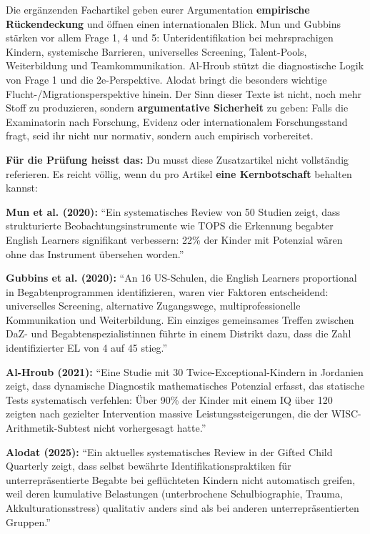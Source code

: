 \documentclass[ngerman, a4paper]{article}
\begin{document}
\begin{kapitelueberblick}
Die ergänzenden Fachartikel geben eurer Argumentation \textbf{empirische Rückendeckung} und öffnen einen internationalen Blick. Mun und Gubbins stärken vor allem Frage 1, 4 und 5: Unteridentifikation bei mehrsprachigen Kindern, systemische Barrieren, universelles Screening, Talent-Pools, Weiterbildung und Teamkommunikation. Al-Hroub stützt die diagnostische Logik von Frage 1 und die 2e-Perspektive. Alodat bringt die besonders wichtige Flucht-/Migrationsperspektive hinein. Der Sinn dieser Texte ist nicht, noch mehr Stoff zu produzieren, sondern \textbf{argumentative Sicherheit} zu geben: Falls die Examinatorin nach Forschung, Evidenz oder internationalem Forschungsstand fragt, seid ihr nicht nur normativ, sondern auch empirisch vorbereitet.

\medskip\textbf{Für die Prüfung heisst das:} Du musst diese Zusatzartikel nicht vollständig referieren. Es reicht völlig, wenn du pro Artikel \textbf{eine Kernbotschaft} behalten kannst:

\medskip\textbf{Mun et al. (2020):} \enquote{Ein systematisches Review von 50 Studien zeigt, dass
strukturierte Beobachtungsinstrumente wie TOPS die Erkennung begabter English Learners
signifikant verbessern: 22\% der Kinder mit Potenzial wären ohne das Instrument übersehen
worden.}

\medskip\textbf{Gubbins et al. (2020):} \enquote{An 16 US-Schulen, die English Learners proportional
in Begabtenprogrammen identifizieren, waren vier Faktoren entscheidend: universelles
Screening, alternative Zugangswege, multiprofessionelle Kommunikation und Weiterbildung.
Ein einziges gemeinsames Treffen zwischen DaZ- und Begabtenspezialistinnen führte in
einem Distrikt dazu, dass die Zahl identifizierter EL von 4 auf 45 stieg.}

\medskip\textbf{Al-Hroub (2021):} \enquote{Eine Studie mit 30 Twice-Exceptional-Kindern in Jordanien
zeigt, dass dynamische Diagnostik mathematisches Potenzial erfasst, das statische Tests
systematisch verfehlen: Über 90\% der Kinder mit einem IQ über 120 zeigten nach gezielter
Intervention massive Leistungssteigerungen, die der WISC-Arithmetik-Subtest nicht
vorhergesagt hatte.}

\medskip\textbf{Alodat (2025):} \enquote{Ein aktuelles systematisches Review in der \textup{Gifted Child
Quarterly} zeigt, dass selbst bewährte Identifikationspraktiken für unterrepräsentierte
Begabte bei geflüchteten Kindern nicht automatisch greifen, weil deren kumulative
Belastungen (unterbrochene Schulbiographie, Trauma, Akkulturationsstress) qualitativ anders
sind als bei anderen unterrepräsentierten Gruppen.}
\end{kapitelueberblick}
\end{document}
